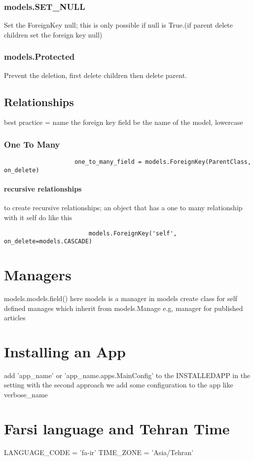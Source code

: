 \documentclass{article}
\begin{document}
			\subsubsection{models.SET\_NULL}
				Set the ForeignKey null; this is only possible if null is True.(if parent delete children set the foreign key null)
				
			\subsubsection{models.Protected}
				Prevent the deletion, first delete children then delete parent.
		\subsection{Relationships}
			best practice = name the foreign key field be the name of the model, lowercase
			\subsubsection{One To Many}
				\begin{verbatim}
					one_to_many_field = models.ForeignKey(ParentClass, on_delete)
				\end{verbatim}
				\paragraph{recursive relationships}
					to create recursive relationships; an object that has a one to many relationship with it self do like this
					\begin{verbatim}
						models.ForeignKey('self', on_delete=models.CASCADE)
					\end{verbatim}
				
	\section{Managers}
		models.models.field() here models is a manager
		in models create class for self defined manages which inherit from models.Manage e.g, manager for published articles
	\section{Installing an App}
		add 'app\_name' or 'app\_name.apps.MainConfig' to the INSTALLEDAPP in the setting with the second approach we add some configuration
		to the app like verbose\_name
	\section{Farsi language and Tehran Time}
		LANGUAGE\_CODE = 'fa-ir'  TIME\_ZONE = 'Asia/Tehran'
	
\end{document}
